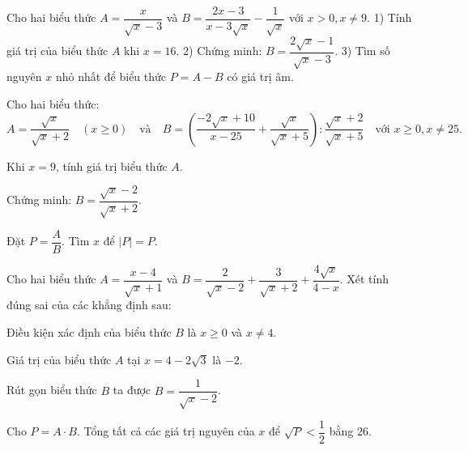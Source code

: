 \documentclass[12pt]{article}
\begin{document}
\begin{bt}


Cho hai biểu thức $A = \dfrac{x}{\sqrt{x}-3}$ và $B = \dfrac{2x-3}{x-3\sqrt{x}} - \dfrac{1}{\sqrt{x}}$ với $x > 0, x \neq 9$.
1) Tính giá trị của biểu thức $A$ khi $x = 16$.
2) Chứng minh: $B = \dfrac{2\sqrt{x}-1}{\sqrt{x}-3}$.
3) Tìm số nguyên $x$ nhỏ nhất để biểu thức $P = A - B$ có giá trị âm.
\loigiai{}
\end{bt}

\begin{bt}
Cho hai biểu thức:
\[ A = \dfrac{\sqrt{x}}{\sqrt{x}+2} \quad (x \ge 0) \quad \text{và} \quad B = \left( \dfrac{-2\sqrt{x}+10}{x-25} + \dfrac{\sqrt{x}}{\sqrt{x}+5} \right) : \dfrac{\sqrt{x}+2}{\sqrt{x}+5} \quad \text{với } x \ge 0, x \ne 25. \]
\begin{cacy}
\item Khi $x=9$, tính giá trị biểu thức $A$.
\item Chứng minh: $B = \dfrac{\sqrt{x}-2}{\sqrt{x}+2}$.
\item Đặt $P = \dfrac{A}{B}$. Tìm $x$ để $|P| = P$.
\end{cacy}
\loigiai{}
\end{bt}

\begin{bt}
Cho hai biểu thức $A = \dfrac{x - 4}{\sqrt{x} + 1}$ và $B = \dfrac{2}{\sqrt{x} - 2} + \dfrac{3}{\sqrt{x} + 2} + \dfrac{4\sqrt{x}}{4 - x}$. Xét tính đúng sai của các khẳng định sau:
\begin{cacy}
\item Điều kiện xác định của biểu thức $B$ là $x \ge 0$ và $x \ne 4$.
\item Giá trị của biểu thức $A$ tại $x = 4 - 2\sqrt{3}$ là $-2$.
\item Rút gọn biểu thức $B$ ta được $B = \dfrac{1}{\sqrt{x} - 2}$.
\item Cho $P = A \cdot B$. Tổng tất cả các giá trị nguyên của $x$ để $\sqrt{P} < \dfrac{1}{2}$ bằng 26.
\end{cacy}
\end{bt}
\end{document}
